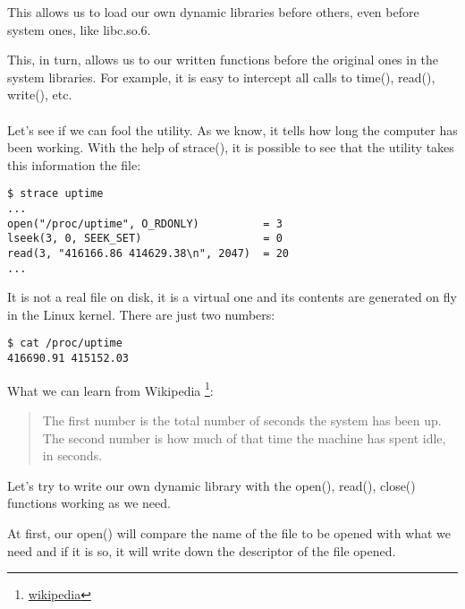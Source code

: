 
\label{ld_preload}

This allows us to load our own dynamic libraries before others, even before system ones, like libc.so.6.

This, in turn, allows us to  our written functions before the original ones in the system libraries.
For example, it is easy to intercept all calls to 
time(), read(), write(), etc. \\
\\
Let's see if we can fool the  utility.
As we know, it tells how long the computer has been working.
With the help of strace(), it is possible to see that the utility takes this information the  file:

\begin{lstlisting}
$ strace uptime 
...
open("/proc/uptime", O_RDONLY)          = 3
lseek(3, 0, SEEK_SET)                   = 0
read(3, "416166.86 414629.38\n", 2047)  = 20
...
\end{lstlisting}

It is not a real file on disk, it is a virtual one and its contents are generated on fly in the Linux kernel.
There are just two numbers:

\begin{lstlisting}
$ cat /proc/uptime
416690.91 415152.03
\end{lstlisting}

What we can learn from Wikipedia
\footnote{\href{http://go.yurichev.com/17043}{wikipedia}}:

\begin{framed}
\begin{quotation}
The first number is the total number of seconds the system has been up.
The second number is how much of that time the machine has spent idle, in seconds.
\end{quotation}
\end{framed}


Let's try to write our own dynamic library with the open(), read(), close() 
functions working as we need.

At first, our open() will compare the name of the file to be opened with what we need and if it is so,
it will write down the descriptor of the file opened.

